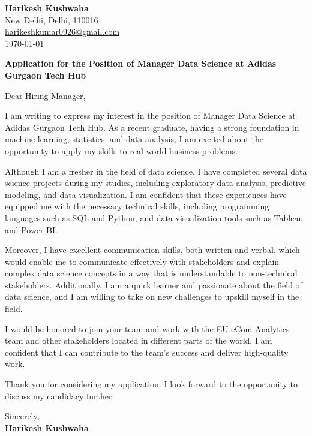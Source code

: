 \documentclass{letter}
\begin{document}
\begin{flushleft}
    \textbf{Harikesh Kushwaha}\\
    New Delhi, Delhi, 110016\\
    \href{mailto:harikeshkumar0926@gmail.com}{harikeshkumar0926@gmail.com}\\
    \today
\end{flushleft}

\begin{center}
    \textbf{Application for the Position of Manager Data Science at Adidas Gurgaon Tech Hub}
\end{center}

Dear Hiring Manager,

I am writing to express my interest in the position of Manager Data Science at Adidas Gurgaon Tech Hub. As a recent graduate, having a strong foundation in machine learning, statistics, and data analysis, I am excited about the opportunity to apply my skills to real-world business problems.

Although I am a fresher in the field of data science, I have completed several data science projects during my studies, including exploratory data analysis, predictive modeling, and data visualization. I am confident that these experiences have equipped me with the necessary technical skills, including programming languages such as SQL and Python, and data visualization tools such as Tableau and Power BI.

Moreover, I have excellent communication skills, both written and verbal, which would enable me to communicate effectively with stakeholders and explain complex data science concepts in a way that is understandable to non-technical stakeholders. Additionally, I am a quick learner and passionate about the field of data science, and I am willing to take on new challenges to upskill myself in the field.

I would be honored to join your team and work with the EU eCom Analytics team and other stakeholders located in different parts of the world. I am confident that I can contribute to the team's success and deliver high-quality work.

Thank you for considering my application. I look forward to the opportunity to discuss my candidacy further.


Sincerely,\\
\textbf{Harikesh Kushwaha}
\end{document}
